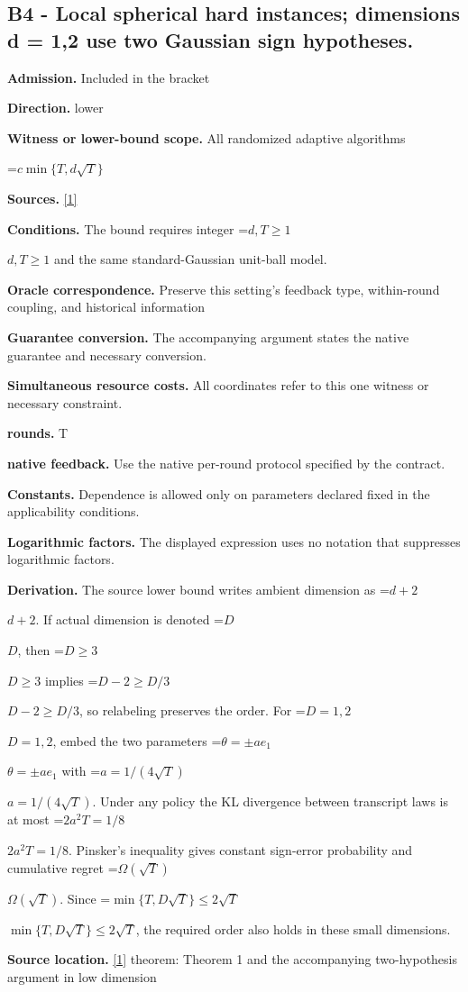 \documentclass[10pt,a4paper]{article}
\newcommand{\AtlasMath}[1]{\par\begingroup\centering\setbox0=\hbox{$\displaystyle #1$}\ifdim\wd0>1.4\linewidth\typeout{ATLAS WIDE FORMULA: \the\wd0}\fi\ifdim\wd0>\linewidth\resizebox{\linewidth}{!}{\box0}\else\box0\fi\par\endgroup}
\newcommand{\AtlasInlineMath}[1]{\begingroup\setbox0=\hbox{$#1$}\ifdim\wd0>.4\linewidth\endgroup\AtlasMath{#1}\else\endgroup$#1$\fi}
\begin{document}
\subsection{B4 - Local spherical hard instances; dimensions d = 1,2 use two Gaussian sign hypotheses.}
\textbf{Admission.} Included in the bracket

\textbf{Direction.} lower

\textbf{Witness or lower-bound scope.} All randomized adaptive algorithms

\AtlasMath{c\min\{T,d\sqrt T\}}
\textbf{Sources.} \href{https://proceedings.mlr.press/v291/zhang25b.html}{[1]}

\textbf{Conditions.} The bound requires integer \AtlasInlineMath{d,T\ge 1} and the same standard-Gaussian unit-ball model.

\textbf{Oracle correspondence.} Preserve this setting's feedback type, within-round coupling, and historical information

\textbf{Guarantee conversion.} The accompanying argument states the native guarantee and necessary conversion.

\textbf{Simultaneous resource costs.} All coordinates refer to this one witness or necessary constraint.

\textbf{rounds.} T

\textbf{native feedback.} Use the native per-round protocol specified by the contract.

\textbf{Constants.} Dependence is allowed only on parameters declared fixed in the applicability conditions.

\textbf{Logarithmic factors.} The displayed expression uses no notation that suppresses logarithmic factors.

\textbf{Derivation.} The source lower bound writes ambient dimension as \AtlasInlineMath{d+2}. If actual dimension is denoted \AtlasInlineMath{D}, then \AtlasInlineMath{D\ge3} implies \AtlasInlineMath{D-2\ge D/3}, so relabeling preserves the order. For \AtlasInlineMath{D=1,2}, embed the two parameters \AtlasInlineMath{\theta=\pm ae_1} with \AtlasInlineMath{a=1/(4\sqrt T)}. Under any policy the KL divergence between transcript laws is at most \AtlasInlineMath{2a^2T=1/8}. Pinsker's inequality gives constant sign-error probability and cumulative regret \AtlasInlineMath{\Omega(\sqrt T)}. Since \AtlasInlineMath{\min\{T,D\sqrt T\}\le2\sqrt T}, the required order also holds in these small dimensions.

\textbf{Source location.} \href{https://proceedings.mlr.press/v291/zhang25b.html}{[1]} theorem: Theorem 1 and the accompanying two-hypothesis argument in low dimension
\end{document}
